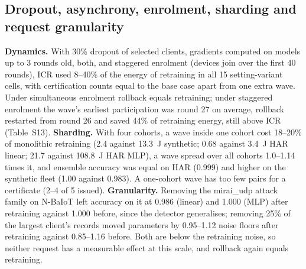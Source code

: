 \documentclass[journal]{IEEEtran}
\begin{document}
\subsection{Dropout, asynchrony, enrolment, sharding and request granularity}\label{sec:dyn}
\textbf{Dynamics.} With 30\% dropout of selected clients, gradients computed on models up to 3 rounds old, both, and staggered enrolment (devices join over the first 40 rounds), ICR used 8--40\% of the energy of retraining in all 15 setting-variant cells, with certification counts equal to the base case apart from one extra wave. Under simultaneous enrolment rollback equals retraining; under staggered enrolment the wave's earliest participation was round 27 on average, rollback restarted from round 26 and saved 44\% of retraining energy, still above ICR (Table~S13).
\textbf{Sharding.} With four cohorts, a wave inside one cohort cost 18--20\% of monolithic retraining (2.4 against 13.3~J synthetic; 0.68 against 3.4~J HAR linear; 21.7 against 108.8~J HAR MLP), a wave spread over all cohorts 1.0--1.14 times it, and ensemble accuracy was equal on HAR (0.999) and higher on the synthetic fleet (1.00 against 0.983). A one-cohort wave has too few pairs for a certificate (2--4 of 5 issued). \textbf{Granularity.} Removing the mirai\_udp attack family on N-BaIoT left accuracy on it at 0.986 (linear) and 1.000 (MLP) after retraining against 1.000 before, since the detector generalises; removing 25\% of the largest client's records moved parameters by 0.95--1.12 noise floors after retraining against 0.85--1.16 before. Both are below the retraining noise, so neither request has a measurable effect at this scale, and rollback again equals retraining.
\end{document}
